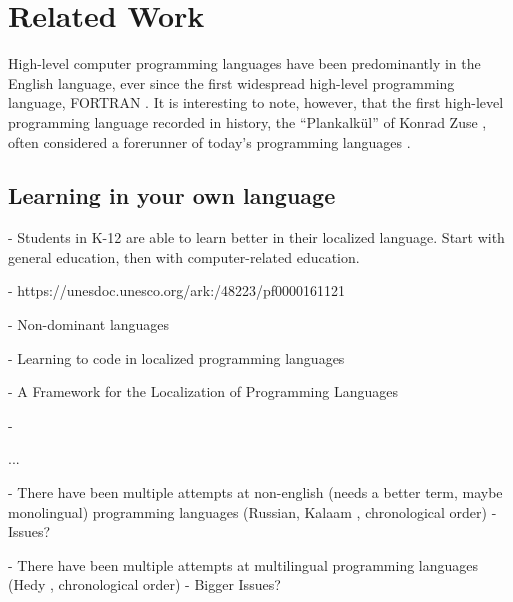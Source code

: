 \documentclass[conference]{IEEEtran}
\begin{document}


\section{Related Work}

High-level computer programming languages have been predominantly in the English language, ever since the first widespread high-level programming language, FORTRAN \cite{backus1978history}. It is interesting to note, however, that the first high-level programming language recorded in history, the “Plankalkül” of Konrad Zuse \cite{zuse1963ansaetze}, often considered a forerunner of today's programming languages \cite{bauer1972plankalkul}.

\subsection{Learning in your own language}
- Students in K-12 are able to learn better in their localized language. Start with general education, then with computer-related education.

  - https://unesdoc.unesco.org/ark:/48223/pf0000161121 \cite{buhmann2008mother}

  - Non-dominant languages \cite{taylor2015finding}
  
  - Learning to code in localized programming languages \cite{dasgupta2017learning}

  - A Framework for the Localization of Programming Languages \cite{swidan2023framework}

  - \cite{otten2023towards}

  ...

- There have been multiple attempts at non-english (needs a better term, maybe monolingual) programming languages (Russian, Kalaam \cite{Kalam_Programming_Language}, chronological order)
  - Issues?

- There have been multiple attempts at multilingual programming languages (Hedy \cite{Hermans_Hedy_A_Gradual}, chronological order)
  - Bigger Issues?
\end{document}
